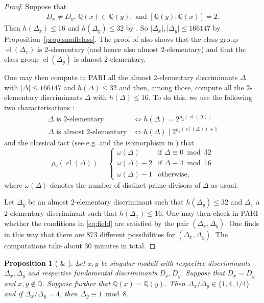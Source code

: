 \documentclass[11pt,a4paper, british]{amsart}
\newtheorem{prop}[thm]{Proposition}
\theoremstyle{definition}
\theoremstyle{remark}
\numberwithin{equation}{section}
\newcommand{\Q}{\mathbb{Q}} %
\DeclareMathOperator{\cl}{cl} %
\begin{document}
\begin{proof}	
	Suppose that
	\begin{align}\label{eq:field}
		D_x \neq D_y, \, \Q(x) \subset \Q(y), \mbox{ and } [\Q(y) : \Q(x)] = 2.
	\end{align}
	Then $h(\Delta_x) \leq 16$ and $h(\Delta_y) \leq 32$ by \cite[Corollary~2.13]{BiluGunTron22}. So $\lvert \Delta_x \rvert, \lvert \Delta_y \rvert \leq 166147$ by Proposition~\ref{prop:smallclass}. The proof of \cite[Corollary~2.13]{BiluGunTron22} also shows that the class group $\cl(\Delta_x)$ is $2$-elementary (and hence also almost $2$-elementary) and that the class group $\cl(\Delta_y)$ is almost $2$-elementary. 
	
	One may then compute in PARI all the almost $2$-elementary discriminants $\Delta$ with $\lvert \Delta \rvert \leq 166147$ and $h(\Delta) \leq 32$ and then, among those, compute all the $2$-elementary discriminants $\Delta$ with $h(\Delta) \leq 16$. To do this, we use the following two characterisations \cite[(2.9), (2.10)]{BiluGunTron22}:
	\begin{align*} 
		\Delta \mbox{ is $2$-elementary} &\iff h(\Delta) = 2^{\rho_2(\cl (\Delta))}\\
		\Delta \mbox{ is almost $2$-elementary} &\iff h(\Delta) \mid 2^{\rho_2(\cl (\Delta))+1}
	\end{align*}
	and the classical fact (see e.g. \cite[Proposition~3.11]{Cox22} and the isomorphism in \cite[(3.19)]{Cox22}) that
	\[ \rho_2(\cl(\Delta)) = \begin{cases}
		\omega(\Delta) & \mbox{if } \Delta \equiv 0 \bmod 32\\
		\omega(\Delta)-2 & \mbox{if } \Delta \equiv 4 \bmod 16\\
		\omega(\Delta) - 1 & \mbox{otherwise,}
	\end{cases} \]
	where $\omega(\Delta)$ denotes the number of distinct prime divisors of $\Delta$ as usual. 
	
	Let $\Delta_y$ be an almost $2$-elementary discriminant such that $h(\Delta_y)\leq 32$ and $\Delta_x$ a $2$-elementary discriminant such that $h(\Delta_x) \leq 16$. One may then check in PARI whether the conditions in \eqref{eq:field} are satisfied by the pair $(\Delta_x, \Delta_y)$. One finds in this way that there are $873$ different possibilities for $(\Delta_x, \Delta_y)$.  The computations take about 30 minutes in total.
\end{proof}



\begin{prop}[{\cite[Proposition~4.3]{AllombertBiluMadariaga15} \& \cite[\S3.2.2]{BiluLucaMadariaga16}}]\label{prop:samefund}
	Let $x, y$ be singular moduli with respective discriminants $\Delta_x, \Delta_y$ and respective fundamental discriminants $D_x, D_y$. Suppose that $D_x = D_y$ and $x, y \notin \Q$. Suppose further that $\Q(x) = \Q(y)$. Then $\Delta_x/ \Delta_y \in \{1, 4, 1/4\}$ and if $\Delta_x / \Delta_y = 4$, then $\Delta_y \equiv 1 \bmod 8$.
\end{prop}
\end{document}
